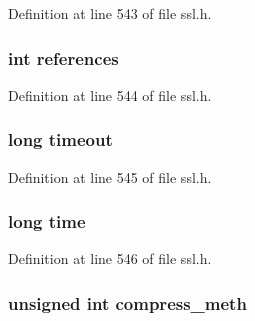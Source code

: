 Definition at line 543 of file ssl.\+h.

\subsubsection[{\texorpdfstring{references}{references}}]{\setlength{\rightskip}{0pt plus 5cm}int references}\hypertarget{structssl__session__st_a146fdb34d9a909e530adf8b189481195}{}\label{structssl__session__st_a146fdb34d9a909e530adf8b189481195}


Definition at line 544 of file ssl.\+h.

\subsubsection[{\texorpdfstring{timeout}{timeout}}]{\setlength{\rightskip}{0pt plus 5cm}long timeout}\hypertarget{structssl__session__st_a0eb73e1ac837828209a5b842000fa3b0}{}\label{structssl__session__st_a0eb73e1ac837828209a5b842000fa3b0}


Definition at line 545 of file ssl.\+h.

\subsubsection[{\texorpdfstring{time}{time}}]{\setlength{\rightskip}{0pt plus 5cm}long time}\hypertarget{structssl__session__st_a8667588dec524bf854d0c16771d425a1}{}\label{structssl__session__st_a8667588dec524bf854d0c16771d425a1}


Definition at line 546 of file ssl.\+h.

\subsubsection[{\texorpdfstring{compress\+\_\+meth}{compress_meth}}]{\setlength{\rightskip}{0pt plus 5cm}unsigned int compress\+\_\+meth}\hypertarget{structssl__session__st_aa10632c44deede371e4149ce6663f832}{}\label{structssl__session__st_aa10632c44deede371e4149ce6663f832}


